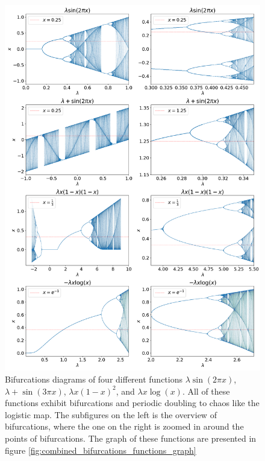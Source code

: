\begin{figure}
	\centering
	\includegraphics[width=\textwidth]{./figures/combined_bifurcations.png}
	\caption{
		Bifurcations diagrams of four different functions 
		$ \lambda \sin(2\pi x)$,
		$ \lambda + \sin(3\pi x)$,
		$ \lambda x(1-x)^2$,
		and $ \lambda x \log(x)$.
		All of these functions exhibit bifurcations and periodic doubling to chaos like the logistic map. 
		The subfigures on the left is the overview of bifurcations, where the one on the right is zoomed in around the points of bifurcations.
		The graph of these functions are presented in figure \ref{fig:combined_bifurcations_functions_graph}
	}
	\label{fig:combined_bifurcations}
\end{figure}

